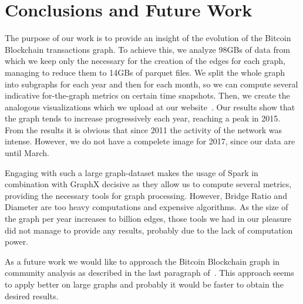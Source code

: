 \section{Conclusions and Future Work}
\label{sec:conclusions}

The purpose of our work is to provide an insight of the evolution of the
Bitcoin Blockchain transactions graph. To achieve this, we analyze 98GBs of
data from which we keep only the necessary for the creation of the edges for each graph, managing 
to reduce them to 14GBs of parquet files. We split the whole graph
into subgraphs for each year and then for each month, so we can compute several
indicative for-the-graph metrics on certain time snapshots. Then, we create the
analogous visualizations which we upload at our website~\cite{website}. Our
results show that the graph tends to increase progressively each year, reaching
a peak in 2015. From the results it is obvious that since 2011 the activity of
the network was intense. However, we do not have a compelete image for 2017,
since our data are until March. 

Engaging with such a large graph-dataset makes the usage of Spark in
combination with GraphX decisive as they allow us to compute several metrics,
providing the necessary tools for graph processing. However, Bridge Ratio and
Diameter are too heavy computations and expensive algorithms. As the size of
the graph per year increases to billion edges, those tools we had in our
pleasure did not manage to provide any results, probably due to the lack of computation
power. 

As a future work we would like to approach the Bitcoin Blockchain graph in community analysis as described in the last paragraph of~. This approach seems to apply better on large graphs and probably it would be faster to obtain the desired results.